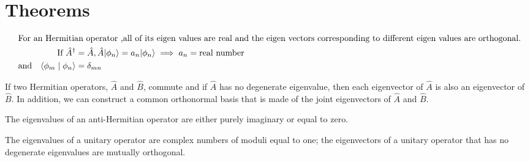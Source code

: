 \section{Theorems} 
\begin{theorem}
	\begin{align*}
\intertext{	For an Hermitian operator ,all of its eigen values are real and the eigen vectors corresponding to different eigen values are orthogonal.}	
\text{	If }\hat{A}^{\dagger}&=\hat{A}, \hat{A}|\phi_{n}\rangle =a_n |\phi_{n}\rangle \implies a_n=\text{real number }\\
\text{	and}\quad 
	\langle \phi_{m}\mid \phi_{n}\rangle&=\delta_{mn}
	\end{align*}
\end{theorem}
\begin{theorem}
If two Hermitian operators, $\hat{A}$ and $\hat{B}$, commute and if $\hat{A}$ has no degenerate eigenvalue, then each eigenvector of $\hat{A}$ is also an eigenvector of $\hat{B}$. In addition, we can construct a common orthonormal basis that is made of the joint eigenvectors of $\hat{A}$ and $\hat{B}$.
\end{theorem}
\begin{theorem}
 The eigenvalues of an anti-Hermitian operator are either purely imaginary or equal to zero.
\end{theorem}
\begin{theorem}
	 The eigenvalues of a unitary operator are complex numbers of moduli equal to one; the eigenvectors of a unitary operator that has no degenerate eigenvalues are mutually orthogonal.
\end{theorem}

